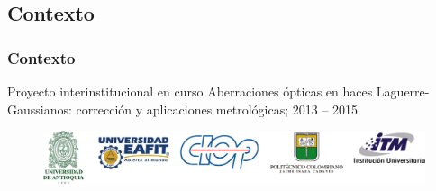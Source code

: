 \documentclass[xcolor=table,serif]{beamer}
\newif\ifplacelogo %
\begin{document}

\subsection{Contexto}
   \placelogotrue
 \begin{frame}
   \frametitle{Contexto}
   \begin{block}{\centering Proyecto interinstitucional en curso} 
	\justifying
   Aberraciones ópticas en haces Laguerre-Gaussianos:
       corrección y aplicaciones metrológicas; 2013 – 2015
   \end{block}
   \begin{figure}
     \centering
     \includegraphics[scale = .5]{Figures/presentation/instituciones.png}
   \end{figure}
 \end{frame}
\end{document}
